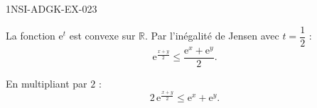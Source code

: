 \begin{corrige}{1NSI-ADGK-EX-023}

La fonction $\mathrm{e}^t$ est convexe sur $\mathbb{R}$. Par l'inégalité de Jensen avec $t = \dfrac{1}{2}$ :
\[ \mathrm{e}^{\frac{x+y}{2}} \leq \frac{\mathrm{e}^x + \mathrm{e}^y}{2}. \]


En multipliant par $2$ :
\[ 2\,\mathrm{e}^{\frac{x+y}{2}} \leq \mathrm{e}^x + \mathrm{e}^y. \]

\end{corrige}
